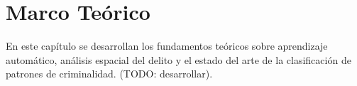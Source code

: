 
\chapter{Marco Teórico}

\label{cap:marco_teorico}

En este capítulo se desarrollan los fundamentos teóricos sobre aprendizaje
automático, análisis espacial del delito y el estado del arte de la
clasificación de patrones de criminalidad. (TODO: desarrollar).

 
